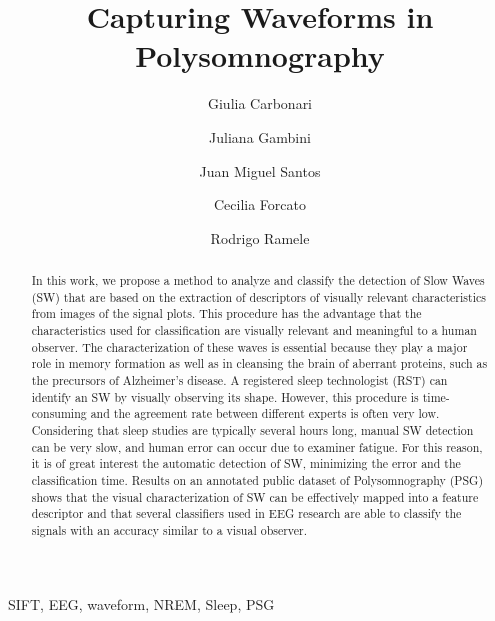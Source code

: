\documentclass[review]{elsarticle}
\begin{document}
\begin{frontmatter}

\title{Capturing Waveforms in Polysomnography}

\author{Giulia Carbonari}
\author{Juliana Gambini}
\author{Juan Miguel Santos}
\author{Cecilia Forcato}
\author{Rodrigo Ramele}
\address{Instituto Tecnológico de Buenos Aires}




\begin{abstract}
In this work, we propose a method to analyze and classify the detection of Slow Waves (SW) that are based on the extraction of descriptors of visually relevant characteristics from images of the signal plots. This procedure has the advantage that the characteristics used for classification are visually relevant and meaningful to a human observer. The characterization of these waves is essential because they play a major role in memory formation as well as in cleansing the brain of aberrant proteins, such as the precursors of Alzheimer's disease. A registered sleep technologist (RST) can identify an SW by visually observing its shape.  However, this procedure is time-consuming and the agreement rate between different experts is often very low. Considering that sleep studies are typically several hours long, manual SW detection can be very slow, and human error can occur due to examiner fatigue. For this reason, it is of great interest the automatic detection of SW, minimizing the error and the classification time.  Results on an annotated public dataset of Polysomnography (PSG) shows that the visual characterization of SW can be effectively mapped into a feature descriptor and that several classifiers used in EEG research are able to classify the signals with an accuracy similar to a visual observer.
\end{abstract}

\begin{keyword}
SIFT, EEG, waveform, NREM, Sleep, PSG
\end{keyword}

\end{frontmatter}
\end{document}

